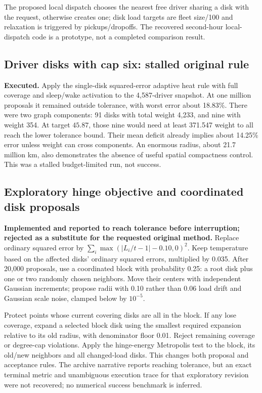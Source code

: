 \documentclass[11pt]{article}
\begin{document}
The proposed local dispatch chooses the nearest free driver sharing a disk
with the request, otherwise creates one; disk load targets are fleet size/100
and relaxation is triggered by pickups/dropoffs. The recovered second-hour
local-dispatch code is a prototype, not a completed comparison result.

\subsection{Driver disks with cap six: stalled original rule}
\textbf{Executed.} Apply the single-disk squared-error adaptive heat rule with
full coverage and sleep/wake activation to the 4,587-driver snapshot. At one
million proposals it remained outside tolerance, with worst error about 18.83\%.
There were two graph components: 91 disks with total weight 4,233, and nine
with weight 354. At target $45.87$, those nine would need at least 371.547
weight to all reach the lower tolerance bound. Their mean deficit already
implies about 14.25\% error unless weight can cross components. An enormous
radius, about 21.7 million km, also demonstrates the absence of useful spatial
compactness control. This was a stalled budget-limited run, not success.

\subsection{Exploratory hinge objective and coordinated disk proposals}
\textbf{Implemented and reported to reach tolerance before interruption; rejected
as a substitute for the requested original method.}
Replace ordinary squared error by
$\sum_i\max(|L_i/t-1|-0.10,0)^2$. Keep temperature based on the affected disks'
ordinary squared errors, multiplied by 0.035. After 20,000 proposals, use a
coordinated block with probability 0.25: a root disk plus one or two randomly
chosen neighbors. Move their centers with independent Gaussian increments;
propose radii with 0.10 rather than 0.06 load drift and Gaussian scale noise,
clamped below by $10^{-5}$.

Protect points whose current covering disks are all in the block. If any lose
coverage, expand a selected block disk using the smallest required expansion
relative to its old radius, with denominator floor 0.01. Reject remaining
coverage or degree-cap violations. Apply the hinge-energy Metropolis test to
the block, its old/new neighbors and all changed-load disks. This changes both
proposal and acceptance rules. The archive narrative reports reaching tolerance,
but an exact terminal metric and unambiguous execution trace for that exploratory
revision were not recovered; no numerical success benchmark is inferred.
\end{document}
